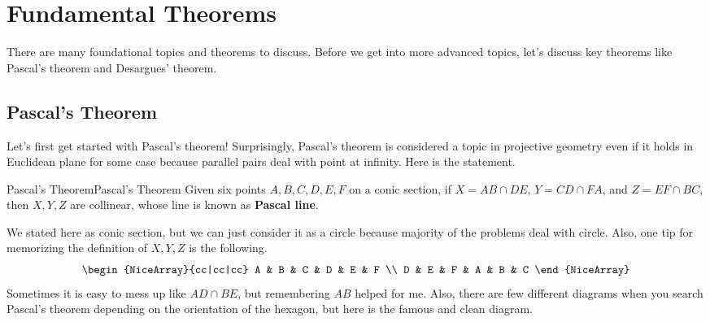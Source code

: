 \documentclass[../../../main.tex]{subfiles}
\begin{document}
\section{Fundamental Theorems}

There are many foundational topics and theorems to discuss.
Before we get into more advanced topics, let's discuss key theorems
like Pascal's theorem and Desargues' theorem.

\subsection{Pascal's Theorem}

Let's first get started with Pascal's theorem! Surprisingly,
Pascal's theorem is considered a topic in projective geometry even if
it holds in Euclidean plane for some case because parallel pairs
deal with point at infinity. Here is the statement.

\begin{theorem}{Pascal's Theorem}{Pascal's Theorem}
Given six points $A, B, C, D, E, F$ on a conic section,
if $X = AB \cap DE$, $Y = CD \cap FA$, and $Z = EF \cap BC$,
then $X, Y, Z$ are collinear, whose line is known as
\textbf{Pascal line}.
\end{theorem}

We stated here as conic section, but we can just consider it as a
circle because majority of the problems deal with circle. Also,
one tip for memorizing the definition of $X, Y, Z$ is the following.
\[
\begin{NiceArray}{cc|cc|cc}
    A & B & C & D & E & F \\
    D & E & F & A & B & C
\end{NiceArray}
\]
Sometimes it is easy to mess up like $AD \cap BE$, but remembering
$AB$ helped for me. Also, there are few different diagrams when you
search Pascal's theorem depending on the orientation of the hexagon,
but here is the famous and clean diagram.
\end{document}
